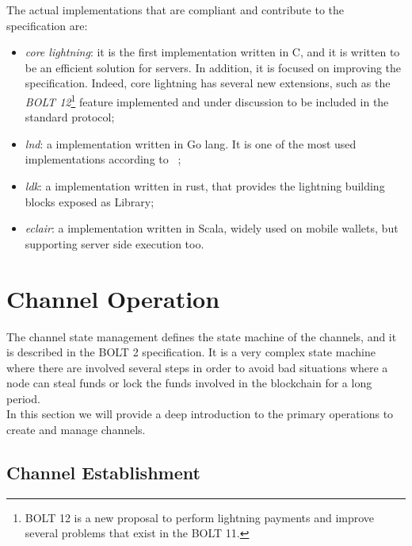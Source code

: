 The actual implementations that are compliant and contribute to the {\LN} specification are:

\begin{itemize}
  \item \emph{core lightning}: it is the first implementation written in C, and it is written
        to be an efficient solution for servers. In addition, it is focused on improving the {\LN} specification. Indeed, core lightning has several new extensions, such as the \emph{BOLT 12}\footnote{BOLT 12 is a new proposal to perform
        lightning payments and improve several problems that exist in the BOLT 11.} feature implemented and under discussion to be
        included in the standard protocol;
    \item \emph{lnd}: a {\LN} implementation written in Go lang. It is one of the most used {\LN} implementations according to ~\cite{lngossip};
  \item \emph{ldk}: a {\LN} implementation written in rust, that provides the lightning building blocks exposed as Library;
  \item \emph{eclair}: a {\LN} implementation written in Scala, widely used on mobile wallets, but supporting server side execution too.
\end{itemize}

\section{{\LN} Channel Operation}
\label{sec:channel_state}

The channel state management defines the state machine of the channels, and it is described in the BOLT 2 specification. It is a very complex
state machine where there are involved several steps in order to avoid bad
situations where a node can steal funds or lock the funds involved in the blockchain for a long period.\\
In this section we will provide a deep introduction to the primary operations to create and manage channels.

\subsection{Channel Establishment}
\label{sec:open_a_channels}

